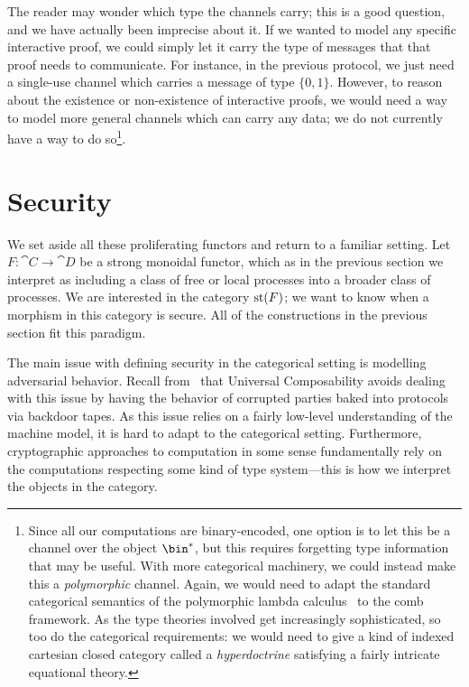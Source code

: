 The reader may wonder which type the channels carry; this is a good question,
and we have actually been imprecise about it. If we wanted to model any specific
interactive proof, we could simply let it carry the type of messages that that
proof needs to communicate. For instance, in the previous protocol, we just need
a single-use channel which carries a message of type $\{0, 1\}$.
However, to reason about the existence or non-existence of interactive proofs,
we would need a way to model more general channels which can carry any data; we
do not currently have a way to do so\footnote{
  Since all our computations are binary-encoded, one option is to let this be a
  channel over the object $\bin^*$, but this requires forgetting type information
  that may be useful. With more categorical machinery, we could instead make this
  a \emph{polymorphic} channel. Again, we would need to adapt the standard
  categorical semantics of the polymorphic lambda calculus~\cite{seely-1987} to
  the comb framework. As the type theories involved get increasingly
  sophisticated, so too do the categorical requirements: we would need to give a
  kind of indexed cartesian closed category called a \emph{hyperdoctrine}
  satisfying a fairly intricate equational theory.
}.

\section{Security}
\label{sec:security}

We set aside all these proliferating functors and return to a familiar setting.
Let $F: \cat{C}\to\cat{D}$ be a strong monoidal functor, which as in the
previous section we interpret as including a class of free or local processes
into a broader class of processes. We are interested in the category
$\operatorname*{st}(F)$; we want to know when a morphism in this category is secure. All of
the constructions in the previous section fit this paradigm.

The main issue with defining security in the categorical setting is modelling
adversarial behavior. Recall from~
that Universal Composability avoids
dealing with this issue by having the behavior of corrupted parties baked into
protocols via backdoor tapes. As this issue relies on a fairly low-level
understanding of the machine model, it is hard to adapt to the categorical
setting. Furthermore, cryptographic approaches to computation in some sense
fundamentally rely on the computations respecting some kind of type
system---this is how we interpret the objects in the category.

